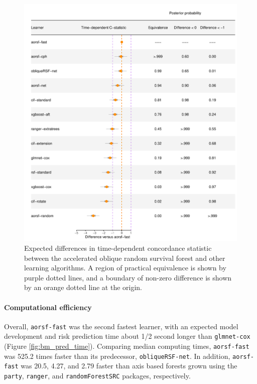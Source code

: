 \documentclass[twoside,11pt]{article}\usepackage[]{graphicx}\usepackage[]{xcolor}
\makeatletter
\def\maxwidth{ %
  \ifdim\Gin@nat@width>\linewidth
    \linewidth
  \else
    \Gin@nat@width
  \fi
}
\newenvironment{knitrout}{}{} %
\makeatother
\begin{document}
\begin{knitrout}
\color{fgcolor}\begin{figure}
\includegraphics[width=\maxwidth]{figure/bm_pred_model_viz_cstat-1} \caption[Expected differences in time-dependent concordance statistic between the accelerated oblique random survival forest and other learning algorithms]{Expected differences in time-dependent concordance statistic between the accelerated oblique random survival forest and other learning algorithms. A region of practical equivalence is shown by purple dotted lines, and a boundary of non-zero difference is shown by an orange dotted line at the origin.}\label{fig:bm_pred_model_viz_cstat}
\end{figure}

\end{knitrout}




\paragraph{Computational efficiency}

Overall, \texttt{aorsf-fast} was the second fastest learner, with an expected model development and risk prediction time about 1/2 second longer than \texttt{glmnet-cox} (Figure \ref{fig:bm_pred_time}). Comparing median computing times, \texttt{aorsf-fast} was 525.2 times faster than its predecessor, \texttt{obliqueRSF-net}. In addition, \texttt{aorsf-fast} was 20.5, 4.27, and 2.79 faster than axis based forests grown using the \texttt{party}, \texttt{ranger}, and \texttt{randomForestSRC} packages, respectively.
\end{document}
